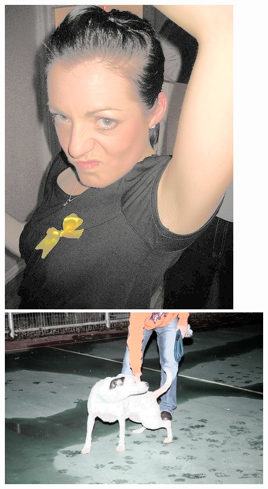 \begin{appendices}
\begin{figure}[htb]
\begin{minipage}{0.19\textwidth}
\end{minipage}
\begin{minipage}{0.19\textwidth}
\includegraphics[width=\textwidth]{images/anomalien/HA/000750.jpg}
\end{minipage}
\begin{minipage}{0.19\textwidth}
\includegraphics[width=\textwidth]{images/anomalien/HA/000777.jpg}

\end{minipage}
\end{figure}
\end{appendices}
